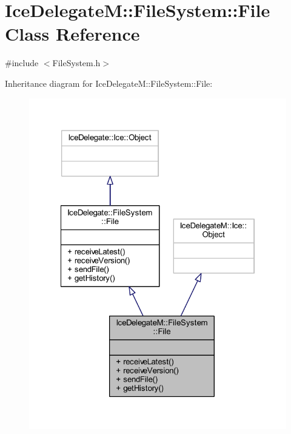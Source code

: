 \hypertarget{class_ice_delegate_m_1_1_file_system_1_1_file}{}\section{Ice\+Delegate\+M\+:\+:File\+System\+:\+:File Class Reference}
\label{class_ice_delegate_m_1_1_file_system_1_1_file}


{\ttfamily \#include $<$File\+System.\+h$>$}



Inheritance diagram for Ice\+Delegate\+M\+:\+:File\+System\+:\+:File\+:
\nopagebreak
\begin{figure}[H]
\begin{center}
\leavevmode
\includegraphics[width=322pt]{class_ice_delegate_m_1_1_file_system_1_1_file__inherit__graph}
\end{center}
\end{figure}


